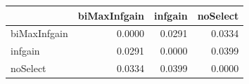 \begin{tabular}{lrrr}
\toprule
 & biMaxInfgain & infgain & noSelect \\
\midrule
biMaxInfgain & 0.0000 & 0.0291 & 0.0334 \\
infgain & 0.0291 & 0.0000 & 0.0399 \\
noSelect & 0.0334 & 0.0399 & 0.0000 \\
\bottomrule
\end{tabular}
